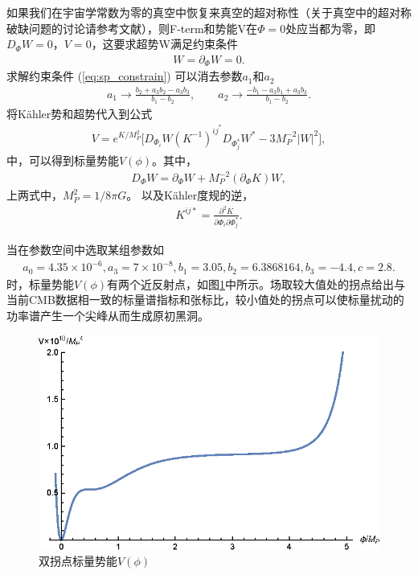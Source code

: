 如果我们在宇宙学常数为零的真空中恢复来真空的超对称性（关于真空中的超对称破缺问题的讨论请参考文献\citep{gao2015inflection}），则F-term和势能V在$\Phi=0$处应当都为零，即$D_{\Phi}W=0$，$V=0$，这要求超势W满足约束条件
\begin{align}\label{eq:sp_constrain}
    W=\partial_{\Phi}W=0.
\end{align}
求解约束条件 (\ref{eq:sp_constrain}) 可以消去参数$a_1$和$a_2$
\begin{align}
    a_1\rightarrow \frac{b_2+a_3b_2-a_3b_3}{b_1-b_2},\qquad 
    a_2\rightarrow \frac{-b_1-a_3b_1+a_3b_3}{b_1-b_2}.
\end{align}
将K\"ahler势和超势代入到公式
\begin{align}
    V=e^{K/M^2_P}\lbrack
    D_{\Phi_i}W{(K^{-1})}^{ij^{*}}D_{\Phi^{*}_j}W^{*}-3M^{-2}_P|W|^2\rbrack,
\end{align}
中，可以得到标量势能$V(\phi)$。其中，
\begin{align}
    D_{\Phi}W=\partial_{\Phi}W+M^{-2}_P{(\partial_{\Phi}K)}W,
\end{align}
上两式中，$M_{P}^{2}=1 /8\pi G$。
以及K\"ahler度规的逆，
\begin{align}
    K^{ij*} = \frac{\partial^2K}{\partial\Phi_i\partial\Phi^{*}_j}.
\end{align}

当在参数空间中选取某组参数如
\begin{align}\label{eq:parameters}
    a_0 = 4.35\times 10^{-6},
    a_3 = 7\times 10^{-8},
    b_1 = 3.05,
    b_2 = 6.3868164,
    b_3 = -4.4,
    c = 2.8.
\end{align}
时，标量势能$V(\phi)$有两个近反射点，如图\ref{fig:potential}中所示。场取较大值处的拐点给出与当前CMB数据相一致的标量谱指标和张标比，较小值处的拐点可以使标量扰动的功率谱产生一个尖峰从而生成原初黑洞。
\begin{figure}[!htbp]
    \centering
    \includegraphics[width=5in]{Img/potential.eps}
    \caption{双拐点标量势能$V(\phi)$}\label{fig:potential}
\end{figure}


